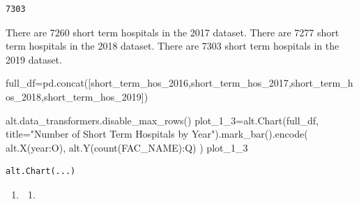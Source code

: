 \documentclass[
  letterpaper,
  DIV=11,
  numbers=noendperiod]{scrartcl}
\newenvironment{Shaded}{\begin{snugshade}}{\end{snugshade}}
\newcommand{\NormalTok}[1]{\textcolor[rgb]{0.00,0.23,0.31}{#1}}
\newcommand{\OperatorTok}[1]{\textcolor[rgb]{0.37,0.37,0.37}{#1}}
\newcommand{\StringTok}[1]{\textcolor[rgb]{0.13,0.47,0.30}{#1}}
\providecommand{\tightlist}{%
  \setlength{\itemsep}{0pt}\setlength{\parskip}{0pt}}\usepackage{longtable,booktabs,array}
\begin{document}
\begin{verbatim}
7303
\end{verbatim}

There are 7260 short term hospitals in the 2017 dataset. There are 7277
short term hospitals in the 2018 dataset. There are 7303 short term
hospitals in the 2019 dataset.

\begin{Shaded}
\begin{Highlighting}[]
\NormalTok{full\_df}\OperatorTok{=}\NormalTok{pd.concat([short\_term\_hos\_2016,short\_term\_hos\_2017,short\_term\_hos\_2018,short\_term\_hos\_2019])}
\end{Highlighting}
\end{Shaded}

\begin{Shaded}
\begin{Highlighting}[]
\NormalTok{alt.data\_transformers.disable\_max\_rows()}
\NormalTok{plot\_1\_3}\OperatorTok{=}\NormalTok{alt.Chart(full\_df, title}\OperatorTok{=}\StringTok{"Number of Short Term Hospitals by Year"}\NormalTok{).mark\_bar().encode(}
\NormalTok{    alt.X(}\StringTok{\textquotesingle{}year:O\textquotesingle{}}\NormalTok{),}
\NormalTok{    alt.Y(}\StringTok{\textquotesingle{}count(FAC\_NAME):Q\textquotesingle{}}\NormalTok{)}
\NormalTok{)}
\NormalTok{plot\_1\_3}
\end{Highlighting}
\end{Shaded}

\begin{verbatim}
alt.Chart(...)
\end{verbatim}

\begin{enumerate}
\def\labelenumi{\arabic{enumi}.}
\setcounter{enumi}{3}
\tightlist
\item
  \begin{enumerate}
  \def\labelenumii{\alph{enumii}.}
  \tightlist
  \item
  \end{enumerate}
\end{enumerate}
\end{document}
